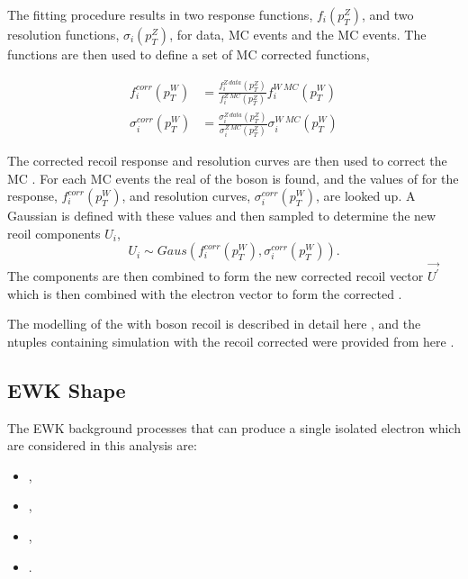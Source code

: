 The fitting procedure results in two response functions, $f_i(p_T^Z)$, and two
resolution functions, $\sigma_i(p_T^Z)$, for \PZ data, \PZ \ac{MC} events and
the \PW \ac{MC} events. The functions are then used to define a set of \PW
\ac{MC} corrected functions, 

\begin{align}
f^{corr}_i (p^{W}_T)      
  &= \frac{ f^{Z\ data}_i (p^{Z}_T) }
          { f^{Z\ MC}_i (p^{Z}_T) }
          f^{W\ MC}_i (p^{W}_T) \\
\sigma^{corr}_i (p^{W}_T) 
  &= \frac{ \sigma^{Z\ data}_i (p^{Z}_T) }
          { \sigma^{Z\ MC}_i (p^{Z}_T) }
          \sigma^{W\ MC}_i (p^{W}_T) 
\end{align}

The corrected recoil response and resolution curves are then used to correct the
\PW \ac{MC} \ETm. For each \PW \ac{MC} events the real \pT of the boson is
found, and the values of for the response, $f^{corr}_i (p^{W}_T)$, and
resolution curves, $\sigma^{corr}_i (p^{W}_T) $, are looked up. A Gaussian is
defined with these values and then sampled to determine the new reoil
components $U_i$,
\begin{equation}
U_i \sim Gaus(f^{corr}_i (p^{W}_T), \sigma^{corr}_i (p^{W}_T) ).
\end{equation}
The components are then combined to form the new corrected recoil vector
$\vec{U^{\prime}}$ which is then combined with the electron vector to
form the corrected \ETm.

The modelling of the \HepProcess{\PW\to\Plepton\Pnu} \ETm with boson recoil is
described in detail here \cite{NULL}, and the ntuples containing
\HepProcess{\PW\to\Pelectron\Pnu} simulation with the recoil corrected \ETm were
provided from here \cite{NULL}.

\subsection{\ac{EWK} \ETm Shape}
The EWK background processes that can produce a single isolated
electron which are considered in this analysis are:
\begin{itemize}
\item \HepProcess{\PZ\to\Pelectron\APelectron},
\item \HepProcess{\PZ\to\Ptauon\APtauon},
\item \HepProcess{\PW\to\Ptau\Pnu},
\item \HepProcess{\Ptop\APtop}.
\end{itemize}

